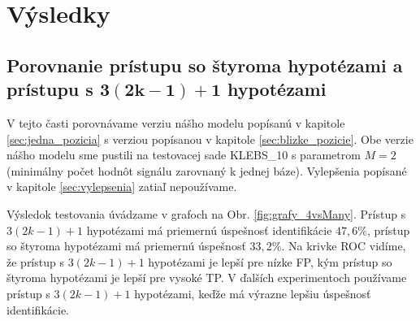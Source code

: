\section{Výsledky}

\subsection[Porovnanie prístupu so štyroma hypotézami a prístupu s $3(2k-1)+1$ hypotézami]{Porovnanie prístupu so štyroma hypotézami a prístupu s $\boldsymbol{3(2k-1)+1}$ hypotézami}
\label{exp:4vsMany}
V tejto časti porovnávame verziu nášho modelu popísanú v kapitole \ref{sec:jedna_pozicia} s
verziou popísanou v kapitole \ref{sec:blizke_pozicie}.
Obe verzie nášho modelu sme pustili na testovacej sade KLEBS\_10 s parametrom $M=2$ (minimálny počet hodnôt signálu zarovnaný k jednej báze).
Vylepšenia popísané v kapitole \ref{sec:vylepsenia} zatiaľ nepoužívame.


Výsledok testovania úvádzame v grafoch na Obr. \ref{fig:grafy_4vsMany}.
Prístup s $3(2k-1)+1$ hypotézami má priemernú úspešnosť identifikácie $47,6 \%$, prístup so štyroma hypotézami má
priemernú úspešnosť $33,2 \%$.
Na krivke ROC vidíme, že prístup s $3(2k-1)+1$ hypotézami je lepší pre nízke FP, 
kým prístup so štyroma hypotézami je lepší pre vysoké TP. 
V ďalších experimentoch používame prístup s $3(2k-1)+1$ hypotézami, keďže má výrazne lepšiu úspešnosť identifikácie.

